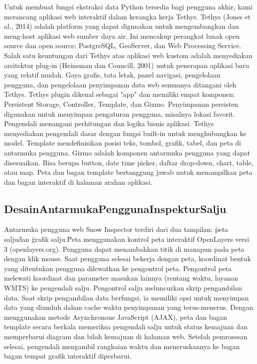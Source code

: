 Untuk membuat fungsi ekstraksi data Python tersedia bagi pengguna akhir, kami merancang aplikasi web interaktif dalam kerangka kerja 
Tethys. Tethys (Jones et al., 2014) adalah platform yang dapat digunakan untuk mengembangkan dan meng-host aplikasi web sumber daya air. 
Ini mencakup perangkat lunak open source dan open source: PostgreSQL, GeoServer, dan Web Processing Service. Salah satu keuntungan dari 
Tethys atas aplikasi web kustom adalah menyediakan arsitektur plug-in (Heineman dan Councill, 2001) untuk penerapan aplikasi baru yang 
relatif mudah. Gaya grafis, tata letak, panel navigasi, pengelolaan pengguna, dan pengelolaan penyimpanan data web semuanya ditangani 
oleh Tethys. Tethys plugin dikenal sebagai "app" dan memiliki empat komponen: Persistent Storage, Controller, Template, dan Gizmo. 
Penyimpanan persisten digunakan untuk menyimpan pengaturan pengguna, misalnya lokasi favorit. Pengendali menangani perhitungan dan 
logika bisnis aplikasi. Tethys menyediakan pengendali dasar dengan fungsi built-in untuk menghubungkan ke model. Template mendefinisikan 
posisi teks, tombol, grafik, tabel, dan peta di antarmuka pengguna. Gizmo adalah komponen antarmuka pengguna yang dapat disesuaikan. 
Bisa berupa button, date time picker, daftar drop-down, chart, table, atau map. Peta dan bagan template bertanggung jawab untuk 
menampilkan peta dan bagan interaktif di halaman arahan aplikasi.

\cite{Kadlec2016Extracting}

\subsection{DesainAntarmukaPenggunaInspekturSalju}

Antarmuka pengguna web Snow Inspector terdiri dari dua tampilan: \"peta salju\" dan \"grafik salju.\" Peta menggunakan kontrol peta interaktif OpenLayers versi 3 (openlayers.org). Pengguna dapat menambahkan titik di manapun pada peta dengan klik mouse. Saat pengguna selesai bekerja dengan peta, koordinat bentuk yang ditentukan pengguna dilewatkan ke pengontrol peta. Pengontrol peta melewati koordinat dan parameter masukan lainnya (rentang waktu, layanan WMTS) ke pengendali salju. Pengontrol salju meluncurkan skrip pengambilan data. Saat skrip pengambilan data berfungsi, ia memiliki opsi untuk menyimpan data yang diunduh dalam cache waktu penyimpanan yang terus-menerus. Dengan menggunakan metode Asynchronous JavaScript (AJAX), peta dan bagan template secara berkala memeriksa pengendali salju untuk status kemajuan dan memperbarui diagram dan bilah kemajuan di halaman web. Setelah pemrosesan selesai, pengendali mengambil rangkaian waktu dan meneruskannya ke bagan bagan tempat grafik interaktif diperbarui.

